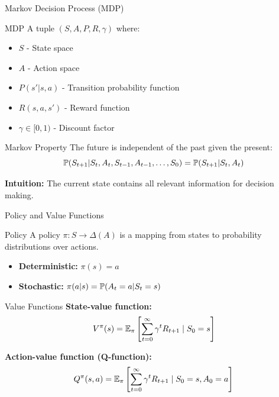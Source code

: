 \documentclass[aspectratio=169]{beamer}
\begin{document}
\begin{frame}{Markov Decision Process (MDP)}
  \begin{definitionbox}{MDP}
    A tuple $(S, A, P, R, \gamma)$ where:
    \begin{itemize}
      \item $S$ - State space
      \item $A$ - Action space
      \item $P(s'|s,a)$ - Transition probability function
      \item $R(s,a,s')$ - Reward function
      \item $\gamma \in [0,1)$ - Discount factor
    \end{itemize}
  \end{definitionbox}

  \vspace{0.5em}

  \begin{theorembox}{Markov Property}
    The future is independent of the past given the present:
    $$\mathbb{P}(S_{t+1}|S_t, A_t, S_{t-1}, A_{t-1}, \ldots, S_0) = \mathbb{P}(S_{t+1}|S_t, A_t)$$
  \end{theorembox}

  \vspace{0.5em}

  \textbf{Intuition:} The current state contains all relevant information for decision making.
\end{frame}

\begin{frame}{Policy and Value Functions}
  \begin{definitionbox}{Policy}
    A policy $\pi: S \to \Delta(A)$ is a mapping from states to probability distributions over actions.
    \begin{itemize}
      \item \textbf{Deterministic:} $\pi(s) = a$
      \item \textbf{Stochastic:} $\pi(a|s) = \mathbb{P}(A_t = a | S_t = s)$
    \end{itemize}
  \end{definitionbox}

  \vspace{0.5em}

  \begin{definitionbox}{Value Functions}
    \textbf{State-value function:}
    $$V^\pi(s) = \mathbb{E}_\pi\left[\sum_{t=0}^\infty \gamma^t R_{t+1} \mid S_0 = s\right]$$

    \textbf{Action-value function (Q-function):}
    $$Q^\pi(s,a) = \mathbb{E}_\pi\left[\sum_{t=0}^\infty \gamma^t R_{t+1} \mid S_0 = s, A_0 = a\right]$$
  \end{definitionbox}
\end{frame}
\end{document}
